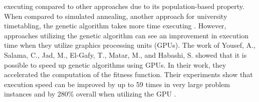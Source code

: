 executing compared to other approaches due to its population-based property. When compared to simulated annealing, another approach for university timetabling, the genetic algorithm takes more time executing \cite{johan-ga-sa-comparison}. However, approaches utilizing the genetic algorithm can see an improvement in execution time when they utilize graphics processing units (GPUs). The work of Yousef, A., Salama, C., Jad, M., El-Gafy, T., Matar, M., and Habashi, S. showed that it is possible to speed up genetic algorithms using GPUs. In their work, they accelerated the computation of the fitness function. Their experiments show that execution speed can be improved by up to 59 times in very large problem instances and by 280\% overall when utilizing the GPU \cite{yousef-gpu-ga}.


%
%
%
%
%